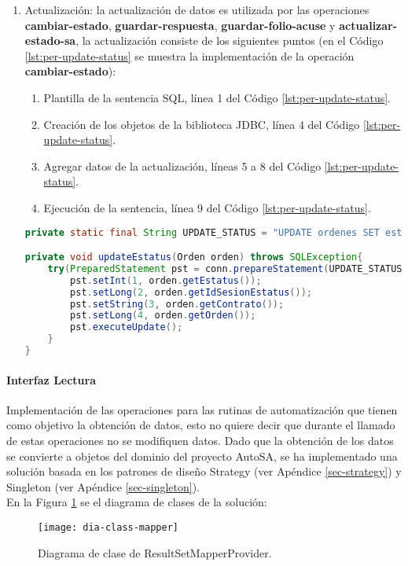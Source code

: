 \begin{enumerate}
	\item Actualización: la actualización de datos es utilizada por las operaciones \textbf{cambiar-estado}, \textbf{guardar-respuesta}, \textbf{guardar-folio-acuse} y \textbf{actualizar-estado-sa}, la actualización consiste de los siguientes puntos (en el Código \ref{lst:per-update-status} se muestra la implementación de la operación \textbf{cambiar-estado}):
	\begin{enumerate}
		\item Plantilla de la sentencia SQL, línea 1 del Código \ref{lst:per-update-status}.
		\item Creación de los objetos de la biblioteca JDBC, línea 4 del Código \ref{lst:per-update-status}.
		\item Agregar datos de la actualización, líneas 5 a 8 del Código \ref{lst:per-update-status}.
		\item Ejecución de la sentencia, línea 9 del Código \ref{lst:per-update-status}.
	\end{enumerate}

	\begin{lstlisting}[language=Java, caption={Actualización del estado de una orden de reposición.}, captionpos=b, label={lst:per-update-status}]
private static final String UPDATE_STATUS = "UPDATE ordenes SET estatus = ?, fecha_estatus = CURRENT_TIMESTAMP, id_sesion_estatus = ? WHERE contrato = ? AND orden = ?";

private void updateEstatus(Orden orden) throws SQLException{
	try(PreparedStatement pst = conn.prepareStatement(UPDATE_STATUS)){
		pst.setInt(1, orden.getEstatus());
		pst.setLong(2, orden.getIdSesionEstatus());
		pst.setString(3, orden.getContrato());
		pst.setLong(4, orden.getOrden());
		pst.executeUpdate();
	}
}
	\end{lstlisting}
\end{enumerate}

\paragraph{\indent Interfaz Lectura\\}
Implementación de las operaciones para las rutinas de automatización que tienen como objetivo la obtención de datos, esto no quiere decir que durante el llamado de estas operaciones no se modifiquen datos.
Dado que la obtención de los datos se convierte a objetos del dominio del proyecto AutoSA, se ha implementado una solución basada en los patrones de diseño Strategy (ver Apéndice \ref{sec-strategy}) y Singleton (ver Apéndice \ref{sec-singleton}). \\
En la Figura \ref{fig:dia-class-mapper} se el diagrama de clases de la solución:
\begin{figure}[h]
	\centering
	\texttt{[image: dia-class-mapper]}
	\caption{Diagrama de clase de ResultSetMapperProvider.}
	\label{fig:dia-class-mapper}
\end{figure}

